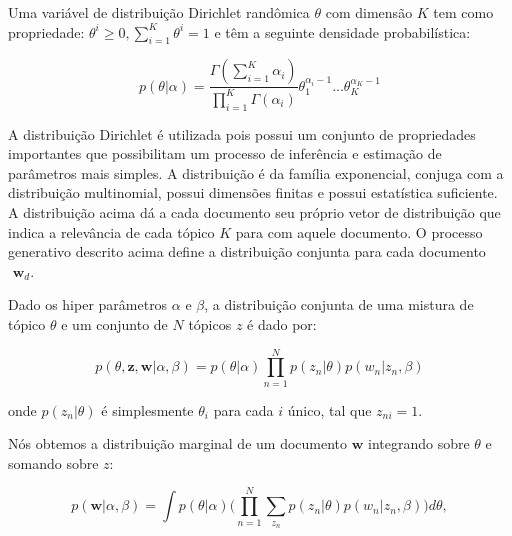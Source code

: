 \documentclass[12pt,a4paper]{article}
\begin{document}

Uma variável de distribuição Dirichlet randômica $\theta$ com dimensão $K$ tem como propriedade: $\theta ^i \geq 0, \displaystyle\sum_{i=1}^{K} \theta ^i = 1$ e têm a seguinte densidade probabilística:

\begin{equation}
p(\theta|\alpha) = \frac{\Gamma(\displaystyle\sum_{i=1}^{K} \alpha _i)}{\displaystyle\prod_{i=1}^{K} \Gamma(\alpha _i)} \theta _1 ^{\alpha _i - 1} ...  \theta _K ^{\alpha _K - 1}
\end{equation}

A distribuição Dirichlet é utilizada pois possui um conjunto de propriedades importantes que possibilitam um processo de inferência e estimação de parâmetros mais simples.
 A distribuição é da família exponencial, conjuga com a distribuição multinomial, possui dimensões finitas e possui estatística suficiente.
 A distribuição  acima dá a cada documento seu próprio vetor de distribuição que indica a relevância de cada tópico $K$ para com aquele documento.
 O processo generativo descrito acima define a distribuição conjunta para cada documento $\textbf{ w}_d$.

Dado os hiper parâmetros $\alpha$ e $\beta$, a distribuição conjunta de uma mistura de tópico $\theta$ e um conjunto de $N$ tópicos $z$ é dado por:

\begin{equation}
p(\theta,\textbf{z},\textbf{w}|\alpha,\beta) = p(\theta|\alpha) \prod_{n=1}^{N} p(z_n|\theta)p(w_n|z_n,\beta)
\end{equation}

onde $p(z_n | \theta)$ é simplesmente $\theta _i$ para cada $i$ único,
 tal que $z_{ni}=1$.
 
 Nós obtemos a distribuição marginal de um documento $\textbf{w}$ integrando sobre $\theta$ e somando sobre $z$:

\begin{equation}
p(\textbf{w}|\alpha,\beta)=\int{p(\theta|\alpha)\Bigg(\prod_{n=1}^{N}\sum_{z_n} p(z_n|\theta)p(w_n|z_n,\beta)\Bigg)d\theta},
\end{equation}
\end{document}
